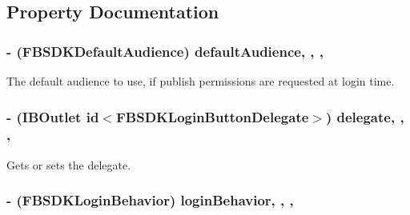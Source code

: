 \subsection{Property Documentation}
\hypertarget{interface_f_b_s_d_k_login_button_a27d7d78187d38c367957bac4b28c7ab6}{
\subsubsection[{default\-Audience}]{\setlength{\rightskip}{0pt plus 5cm}-\/ (F\-B\-S\-D\-K\-Default\-Audience) default\-Audience\hspace{0.3cm}{\ttfamily [read]}, {\ttfamily [write]}, {\ttfamily [nonatomic]}, {\ttfamily [assign]}}}\label{interface_f_b_s_d_k_login_button_a27d7d78187d38c367957bac4b28c7ab6}
The default audience to use, if publish permissions are requested at login time. \hypertarget{interface_f_b_s_d_k_login_button_a9334392431c0fb78a08fe4038a2a30fb}{
\subsubsection[{delegate}]{\setlength{\rightskip}{0pt plus 5cm}-\/ (I\-B\-Outlet id$<${\bf F\-B\-S\-D\-K\-Login\-Button\-Delegate}$>$) delegate\hspace{0.3cm}{\ttfamily [read]}, {\ttfamily [write]}, {\ttfamily [nonatomic]}, {\ttfamily [weak]}}}\label{interface_f_b_s_d_k_login_button_a9334392431c0fb78a08fe4038a2a30fb}
Gets or sets the delegate. \hypertarget{interface_f_b_s_d_k_login_button_afe30ee6f02e53feb1185bea33b5afd8e}{
\subsubsection[{login\-Behavior}]{\setlength{\rightskip}{0pt plus 5cm}-\/ (F\-B\-S\-D\-K\-Login\-Behavior) login\-Behavior\hspace{0.3cm}{\ttfamily [read]}, {\ttfamily [write]}, {\ttfamily [nonatomic]}, {\ttfamily [assign]}}}\label{interface_f_b_s_d_k_login_button_afe30ee6f02e53feb1185bea33b5afd8e}
